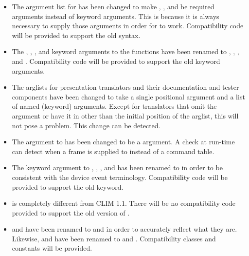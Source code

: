 \begin{itemize}
\item The argument list for  has been changed to
make , , and  be required arguments instead of
keyword arguments.  This is because it is always necessary to supply those
arguments in order for  to work.  Compatibility
code will be provided to support the old syntax.

\item The , ,
, and  keyword arguments to
the  functions have been renamed to ,
, , and
.  Compatibility code will be provided to
support the old keyword arguments.

\item The arglists for presentation translators and their documentation and
tester components have been changed to take a single positional 
argument and a list of named (keyword) arguments.  Except for translators that
omit the  argument or have it in other than the initial position of
the arglist, this will not pose a problem.  This change can be detected.

\item The  argument to  has
been changed to be a  argument.  A check at run-time
can detect when a frame is supplied to
 instead of a command table.

\item The  keyword argument to ,
, , and
 has been renamed to
 in order to be consistent with the device event terminology.
Compatibility code will be provided to support the old keyword.

\item {} is completely different from CLIM 1.1.  There
will be no compatibility code provided to support the old version of
.

\item {} and  have been renamed to
 and  in order to accurately
reflect what they are.  Likewise,  and  have been
renamed to  and .  Compatibility
classes and constants will be provided.
\end{itemize}


